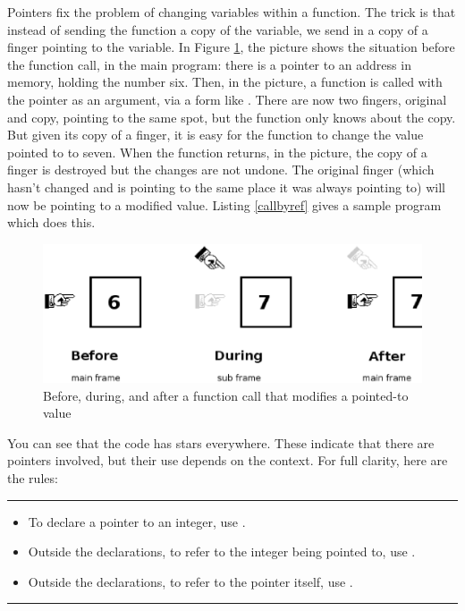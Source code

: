 Pointers  fix the problem of changing variables within a function. The
trick is that instead of sending the function a copy of the variable,
we send in a copy of a finger pointing to the variable. 
In Figure \ref{fingerfig}, the  picture shows the situation
before the function call, in the main program: there is a pointer to an
address in memory, holding the number six. Then, in the  picture,
a function is called with the pointer as an argument, via a form like
.
There are now
two fingers, original and copy, pointing to the same spot, but the
function only knows about the copy.  But given its copy of a finger, it
is easy for the function to change the value pointed to to seven. When
the function returns, in the  picture, the copy of a finger is
destroyed but the changes are not undone.  The original finger (which
hasn't changed and is pointing to the same place it was always pointing
to) will now be pointing to a modified value.  Listing \ref{callbyref}
gives a sample program which does this.


\begin{figure}
\hskip -1cm
\includegraphics[width=\textwidth*\real{1.1}]{finger.ps}
\caption{Before, during, and after a function call that modifies a pointed-to value}
\label{fingerfig}
\end{figure}

\lstset{numbers=left, numberstyle=\scshape}
\lstset{numbers=none}

You can see that the code has stars everywhere. These
indicate that there are pointers involved, but their use depends on the
context.
For full clarity, here are the rules:
\vspace \baselineskip
\hrule
\vspace \baselineskip
\begin{itemize}
\item To declare a pointer to an integer, use .
\item Outside the declarations, to refer to the integer being pointed to, use .
\item Outside the declarations, to refer to the pointer itself, use
.
\end{itemize}
\vspace \baselineskip
\hrule
\vspace \baselineskip

